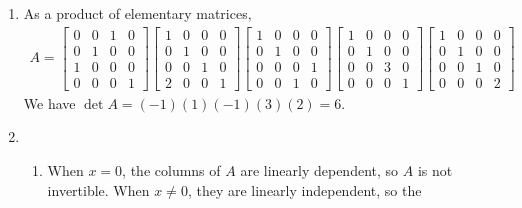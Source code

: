 \documentclass[red]{tutorial}
\makeatletter
\DeclarePairedDelimiter\norm{\lVert}{\rVert}
\DeclarePairedDelimiter\abs{\lvert}{\rvert}
\let\oldnorm\norm
\def\norm{\@ifstar{\oldnorm}{\oldnorm*}}
\let\oldabs\abs
\def\abs{\@ifstar{\oldabs}{\oldabs*}}
\theoremstyle{definition}
\theoremstyle{theorem}
\makeatother
\begin{document}
{\begin{solutions}
\begin{enumerate}
\begin{enumerate}
\begin{align*}
            = \norm*{\lambda T(x)}
            = \abs{\lambda}\norm{T(x)}
            = \lambda \norm*{T(x)}
          \end{align*}
          which establishes almost linearity.
      \end{enumerate}
    \item
      As a product of elementary matrices,
      \begin{align*}
        A =
        \begin{bmatrix}
          0 & 0 & 1 & 0 \\
          0 & 1 & 0 & 0 \\
          1 & 0 & 0 & 0 \\
          0 & 0 & 0 & 1
        \end{bmatrix}
        \begin{bmatrix}
          1 & 0 & 0 & 0 \\
          0 & 1 & 0 & 0 \\
          0 & 0 & 1 & 0 \\
          2 & 0 & 0 & 1
        \end{bmatrix}
        \begin{bmatrix}
          1 & 0 & 0 & 0 \\
          0 & 1 & 0 & 0 \\
          0 & 0 & 0 & 1 \\
          0 & 0 & 1 & 0
        \end{bmatrix}
        \begin{bmatrix}
          1 & 0 & 0 & 0 \\
          0 & 1 & 0 & 0 \\
          0 & 0 & 3 & 0 \\
          0 & 0 & 0 & 1
        \end{bmatrix}
        \begin{bmatrix}
          1 & 0 & 0 & 0 \\
          0 & 1 & 0 & 0 \\
          0 & 0 & 1 & 0 \\
          0 & 0 & 0 & 2
        \end{bmatrix}
      \end{align*}
      We have $\det A=(-1)(1)(-1)(3)(2)=6$.
    \item
      \begin{enumerate}
        \item
          When $x=0$, the columns of $A$ are linearly dependent, so $A$ is not
          invertible. When $x\neq 0$, they are linearly independent, so the

\end{enumerate}
\end{enumerate}
\end{solutions}}
\end{document}
